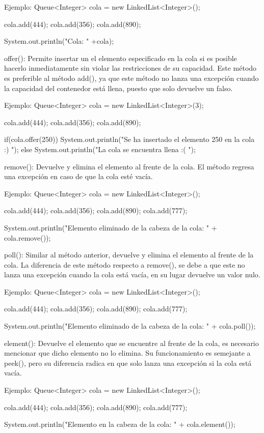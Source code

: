 \documentclass[12pt, letterpaper]{article} %
\begin{document}
Ejemplo:
Queue<Integer> cola = new LinkedList<Integer>();

cola.add(444);
cola.add(356);
cola.add(890);

System.out.println("Cola: " +cola);

offer():
Permite insertar un el elemento especificado en la cola si es posible hacerlo inmediatamente sin violar las restricciones de su capacidad. Este método es preferible al método add(), ya que este método no lanza una excepción cuando la capacidad del contenedor está llena, puesto que solo devuelve un falso.

Ejemplo:
Queue<Integer> cola = new LinkedList<Integer>(3);

cola.add(444);
cola.add(356);
cola.add(890);

if(cola.offer(250)){
System.out.println("Se ha insertado el elemento 250 en la cola :) ");
}
else{
	System.out.println("La cola se encuentra llena :( ");
}


remove():
Devuelve y elimina el elemento al frente de la cola. El método regresa una excepción en caso de que la cola esté vacía.

Ejemplo:
Queue<Integer> cola = new LinkedList<Integer>();

cola.add(444);
cola.add(356);
cola.add(890);
cola.add(777);

System.out.println("Elemento eliminado de la cabeza de la cola: " + cola.remove());


poll():
Similar al método anterior, devuelve y elimina el elemento al frente de la cola. La diferencia de este método respecto a remove(), se debe a que este no lanza una excepción cuando la cola está vacía, en su lugar devuelve un valor nulo.

Ejemplo:
Queue<Integer> cola = new LinkedList<Integer>();

cola.add(444);
cola.add(356);
cola.add(890);
cola.add(777);

System.out.println("Elemento eliminado de la cabeza de la cola: " + cola.poll());


element():
Devuelve el elemento que se encuentre al frente de la cola, es necesario mencionar que dicho elemento no lo elimina. Su funcionamiento es semejante a peek(), pero su diferencia radica en que solo lanza una excepción si la cola está vacía.

Ejemplo:
Queue<Integer> cola = new LinkedList<Integer>();

cola.add(444);
cola.add(356);
cola.add(890);
cola.add(777);

System.out.println("Elemento en la cabeza de la cola: " + cola.element());
\end{document}
